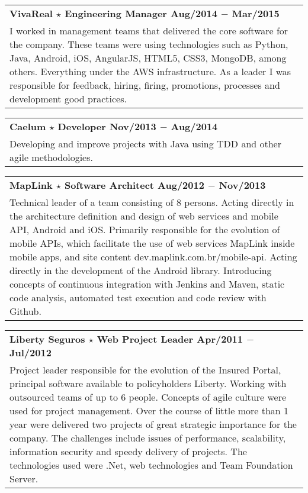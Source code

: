 \documentclass[a4paper, oneside, final]{scrartcl}
\newcommand{\vspc}{\vspace{0.15cm}} %
\begin{document}
\begin{center}
\begin{tabularx}{1\linewidth}{X}
{\bf VivaReal $\star$ Engineering Manager \hfill Aug/2014 $-$ Mar/2015} \\
I worked in management teams that delivered the core software for the company. These teams were using technologies such as Python, Java, Android, iOS, AngularJS, HTML5, CSS3, MongoDB, among others. Everything under the AWS infrastructure. As a leader I was responsible for feedback, hiring, firing, promotions, processes and development good practices. \vspc\\
\end{tabularx}

\begin{tabularx}{1\linewidth}{X}
{\bf Caelum $\star$ Developer \hfill Nov/2013 $-$ Aug/2014} \\
Developing and improve projects with Java using TDD and other agile methodologies. \vspc\\
\end{tabularx}

\begin{tabularx}{1\linewidth}{X}
{\bf MapLink $\star$ Software Architect \hfill Aug/2012 $-$ Nov/2013} \\
Technical leader of a team consisting of 8 persons. Acting directly in the architecture definition and design of web services and mobile API, Android and iOS. Primarily responsible for the evolution of mobile APIs, which facilitate the use of web services MapLink inside mobile apps, and site content dev.maplink.com.br/mobile-api. Acting directly in the development of the Android library. Introducing concepts of continuous integration with Jenkins and Maven, static code analysis, automated test execution and code review with Github. \vspc\\
\end{tabularx}

\begin{tabularx}{1\linewidth}{X}
{\bf Liberty Seguros $\star$ Web Project Leader \hfill Apr/2011 $-$ Jul/2012} \\
Project leader responsible for the evolution of the Insured Portal, principal software available to policyholders Liberty. Working with outsourced teams of up to 6 people. Concepts of agile culture were used for project management. Over the course of little more than 1 year were delivered two projects of great strategic importance for the company. The challenges include issues of performance, scalability, information security and speedy delivery of projects. The technologies used were .Net, web technologies and Team Foundation Server. \vspc\\
\end{tabularx}


\end{center}
\end{document}
